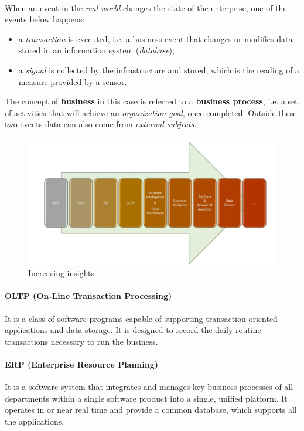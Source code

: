 \paragraph{}
When an event in the \textit{real world} changes the state of the enterprise, one of the events below happens:
\begin{itemize}
    \item a \textit{transaction} is executed, i.e. a business event that changes or modifies data stored in an information system (\textit{database});
    \item a \textit{signal} is collected by the infrastructure and stored, which is the reading of a measure provided by a sensor.
\end{itemize}
The concept of \textbf{business} in this case is referred to a \textbf{business process}, i.e. a set of activities that will achieve an \textit{organization goal}, once completed. Outside these two events data can also come from \textit{external subjects}.

\begin{figure}
    \centering
    \includegraphics[scale=0.6]{images/increasing_insights.jpg}
    \caption{Increasing insights}
    \label{figInsights}
\end{figure}

\paragraph{OLTP (On-Line Transaction Processing)}
It is a class of software programs capable of supporting transaction-oriented applications and data storage. It is designed to record the daily routine transactions necessary to run the business.

\paragraph{ERP (Enterprise Resource Planning)}
It is a software system that integrates and manages key business processes of all departments within a single software product into a single, unified platform. It operates in or near real time and provide a common database, which supports all the applications.

